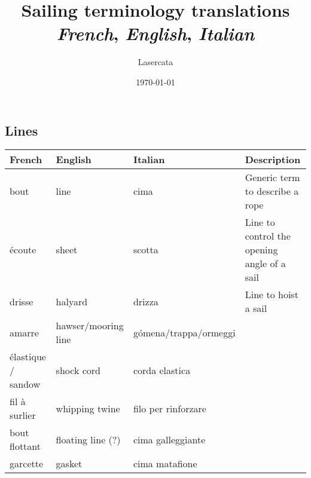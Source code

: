 \documentclass[a4paper, 12pt, twoside]{article}
\title{Sailing terminology translations \\ \textit{French}, \textit{English}, \textit{Italian}}
\author{Lasercata}
\date{\today}
\begin{document}
    
    \maketitle
    
    \tableofcontents
    \newpage
    
    \begin{indt}{\section{Lines}}%
        \begin{tabular}{|l|l|l||p{100pt}|}
            \hline %
            \textbf{French}
            & \textbf{English}
            & \textbf{Italian}
            & \textbf{Description}
            \\
            \hline
            \hline %
            bout %
            & line
            & cima
            & Generic term to describe a rope
            \\
            \hline %
            écoute %
            & sheet
            & scotta
            & Line to control the opening angle of a sail
            \\
            \hline %
            drisse %
            & halyard
            & drizza
            & Line to hoist a sail
            \\
            \hline %
            amarre %
            & hawser/mooring line
            & gómena/trappa/ormeggi
            &
            \\
            \hline %
            élastique / sandow %
            & shock cord
            & corda elastica
            &
            \\
            \hline %
            fil à surlier %
            & whipping twine
            & filo per rinforzare
            &
            \\
            \hline %
            bout flottant %
            & floating line (?)
            & cima galleggiante
            &
            \\
            \hline %
            garcette %
            & gasket
            & cima matafione 
            &
            \\
            \hline %
        \end{tabular}
    \end{indt}%
\end{document}
